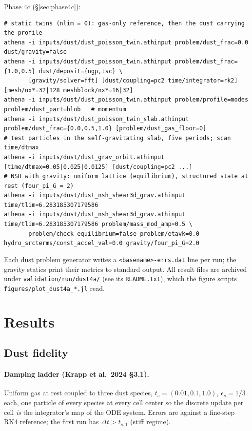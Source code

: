 \documentclass[11pt]{article}
\newcommand{\file}[1]{\texttt{#1}}
\begin{document}
\noindent Phase 4c (\S\ref{sec:phase4c}):
\begin{lstlisting}
# static twins (nlim = 0): gas-only reference, then the dust carrying the profile
athena -i inputs/dust/dust_poisson_twin.athinput problem/dust_frac=0.0 dust/gravity=false
athena -i inputs/dust/dust_poisson_twin.athinput problem/dust_frac={1.0,0.5} dust/deposit={ngp,tsc} \
       [gravity/solver=fft] [dust/coupling=pc2 time/integrator=rk2] [mesh/nx*=32|128 meshblock/nx*=16|32]
athena -i inputs/dust/dust_poisson_twin.athinput problem/profile=modes problem/dust_part=blob   # momentum
athena -i inputs/dust/dust_poisson_twin_slab.athinput problem/dust_frac={0.0,0.5,1.0} [problem/dust_gas_floor=0]
# test particles in the self-gravitating slab, five periods; scan time/dtmax
athena -i inputs/dust/dust_grav_orbit.athinput [time/dtmax=0.05|0.025|0.0125] [dust/coupling=pc2 ...]
# NSH with gravity: uniform lattice (equilibrium), structured state at rest (four_pi_G = 2)
athena -i inputs/dust/dust_nsh_shear3d_grav.athinput time/tlim=6.283185307179586
athena -i inputs/dust/dust_nsh_shear3d_grav.athinput time/tlim=6.283185307179586 problem/mass_mod_amp=0.5 \
       problem/check_equilibrium=false problem/etavk=0.0 hydro_srcterms/const_accel_val=0.0 gravity/four_pi_G=2.0
\end{lstlisting}

Each dust problem generator writes a \file{<basename>-errs.dat} line per run; the
gravity statics print their metrics to standard output. All result files are
archived under \file{validation/run/dust4a/} (see its \file{README.txt}), which the
figure scripts \file{figures/plot\_dust4a\_*.jl} read.

\section{Results}
\label{sec:results}

\subsection{Dust fidelity}
\label{sec:fidelity}

\paragraph{Damping ladder (Krapp et al.\ 2024 \S3.1).} Uniform gas at rest coupled
to three dust species, $t_s = (0.01, 0.1, 1.0)$, $\epsilon_s = 1/3$ each, one particle
of every species at every cell center so the discrete update per cell \emph{is} the
integrator's map of the ODE system. Errors are against a fine-step RK4 reference;
the first run has $\Delta t > t_{s,1}$ (stiff regime).
\end{document}
